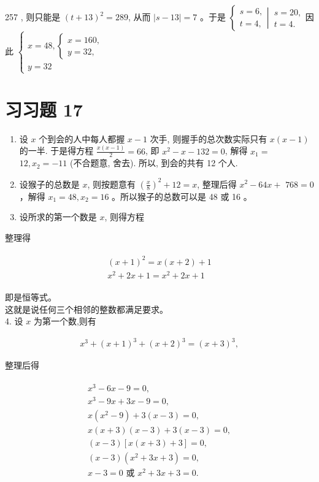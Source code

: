 \documentclass[10pt]{article}
\begin{document}
257 , 则只能是 $(t+13)^{2}=289$, 从而 $|s-13|=7$ 。于是 $\left\{\begin{array}{l}s=6, \\ t=4,\end{array} \left\lvert\, \begin{array}{l}s=20, \\ t=4 .\end{array}\right.\right.$因此 $\left\{\begin{array}{l}x=48,\left\{\begin{array}{l}x=160, \\ y=32,\end{array}\right. \\ y=32\end{array}\right.$

\section*{习习题 17}
\begin{enumerate}
  \item 设 $x$ 个到会的人中每人都握 $x-1$ 次手, 则握手的总次数实际只有 $x(x-1)$ 的一半. 于是得方程 $\frac{x(x-1)}{2}=66$, 即 $x^{2}-x-132=0$, 解得 $x_{1}=$ $12, x_{2}=-11$ (不合题意, 舍去). 所以, 到会的共有 12 个人.
  \item 设猴子的总数是 $x$, 则按题意有 $\left(\frac{x}{8}\right)^{2}+12=x$, 整理后得 $x^{2}-64 x+$ $768=0$ ，解得 $x_{1}=48, x_{2}=16$ 。所以猴子的总数可以是 48 或 16 。
  \item 设所求的第一个数是 $x$, 则得方程
\end{enumerate}

整理得

\begin{align*}
\begin{gathered}
(x+1)^{2}=x(x+2)+1 \\
x^{2}+2 x+1=x^{2}+2 x+1
\end{gathered}
\end{align*}

即是恒等式。\\
这就是说任何三个相邻的整数都满足要求。\\
4. 设 $x$ 为第一个数,则有

\begin{align*}
x^{3}+(x+1)^{3}+(x+2)^{3}=(x+3)^{3},
\end{align*}

整理后得

\begin{align*}
\begin{gathered}
x^{3}-6 x-9=0, \\
x^{3}-9 x+3 x-9=0, \\
x\left(x^{2}-9\right)+3(x-3)=0, \\
x(x+3)(x-3)+3(x-3)=0, \\
(x-3)[x(x+3)+3]=0, \\
(x-3)\left(x^{2}+3 x+3\right)=0, \\
x-3=0 \text { 或 } x^{2}+3 x+3=0 .
\end{gathered}
\end{align*}
\end{document}
